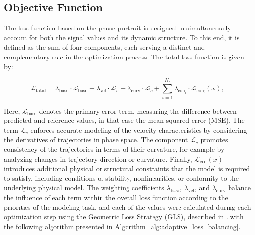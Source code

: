 \documentclass[11pt, oneside]{article}
\begin{document}
\subsection{Objective Function}

The loss function based on the phase portrait is designed to simultaneously account for both the  signal values and its dynamic structure. To this end, it is defined as the sum of four components, each serving a distinct and complementary role in the optimization process. The total loss function is given by:

\begin{equation}
    \mathcal{L}_{\mathrm{total}} = \lambda_{\mathrm{base}} \cdot \mathcal{L}_{\mathrm{base}} + \lambda_{\mathrm{vel}} \cdot \mathcal{L}_{v} + \lambda_{\mathrm{curv}} \cdot \mathcal{L}_{c} + \sum^{N_c}_{i=1} \lambda_{\mathrm{con}_i} \cdot \mathcal{L}_{\mathrm{con}_i}(x),
    \label{eq:loss_function}
\end{equation}

Here, $\mathcal{L}_{\mathrm{base}}$ denotes the primary error term,  measuring the difference between predicted and reference values, in that case the mean squared error (MSE). The term $\mathcal{L}_{v}$ enforces accurate modeling of the velocity characteristics by considering the derivatives of trajectories in phase space. The component $\mathcal{L}_{c}$ promotes consistency of the trajectories in terms of their curvature, for example by analyzing changes in trajectory direction or curvature. Finally, $\mathcal{L}_{\mathrm{con}}(x)$ introduces additional physical or structural constraints that the model is required to satisfy, including conditions of stability, nonlinearities, or conformity to the underlying physical model. The weighting coefficients $\lambda_{\mathrm{base}}$, $\lambda_{\mathrm{vel}}$,  and $\lambda_{\mathrm{curv}}$ balance the influence of each term within the overall loss function according to the priorities of the modeling task, and each of the values were calculated during each optimization step using the Geometric Loss Strategy (GLS), described in \cite{Cipolla2018, Chen2018}. with the following algorithm presented in Algorithm~\ref{alg:adaptive_loss_balancing}.
\end{document}
